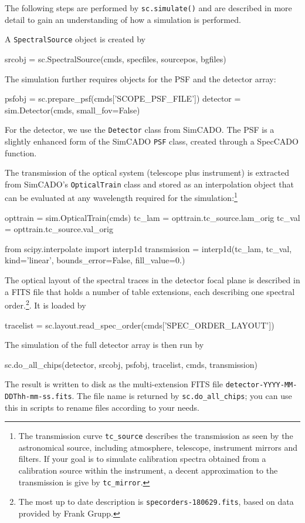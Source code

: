 \documentclass[a4paper,twoside,11pt]{article}
\begin{document}
The following steps are performed by \lstinline{sc.simulate()} and are
described in more detail to gain an understanding of how a simulation
is performed.

A \lstinline{SpectralSource} object is created by
\begin{pyin}
srcobj = sc.SpectralSource(cmds, specfiles, sourcepos, bgfiles)
\end{pyin}

The simulation further requires objects for the PSF and the detector
array:
\begin{pyin}
psfobj = sc.prepare_psf(cmds['SCOPE_PSF_FILE'])
detector = sim.Detector(cmds, small_fov=False)
\end{pyin}
For the detector, we use the \lstinline{Detector} class from
SimCADO. The PSF is a slightly enhanced form of the SimCADO
\lstinline{PSF} class, created through a SpecCADO function.

The transmission of the optical system (telescope plus instrument) is
extracted from SimCADO's \lstinline{OpticalTrain} class and stored as
an interpolation object that can be evaluated at any wavelength
required for the simulation:\footnote{The transmission curve
  \lstinline{tc_source} describes the transmission as seen by the
  astronomical source, including atmosphere, telescope, instrument
  mirrors and filters. If your goal is to simulate calibration spectra
  obtained from a calibration source within the instrument, a decent
  approximation to the transmission is give by \lstinline{tc_mirror}.}
\begin{pyin}
opttrain = sim.OpticalTrain(cmds)
tc_lam = opttrain.tc_source.lam_orig
tc_val = opttrain.tc_source.val_orig

from scipy.interpolate import interp1d
transmission = interp1d(tc_lam, tc_val, kind='linear',
                        bounds_error=False, fill_value=0.)
\end{pyin}

The optical layout of the spectral traces in the detector focal plane
is described in a FITS file that holds a number of table extensions,
each describing one spectral order.\footnote{The most up to date
  description is \lstinline{specorders-180629.fits}, based on data
  provided by Frank Grupp.}. It is loaded by
\begin{pyin}
tracelist = sc.layout.read_spec_order(cmds['SPEC_ORDER_LAYOUT'])
\end{pyin}

The simulation of the full detector array is then run by
\begin{pyin}
sc.do_all_chips(detector, srcobj, psfobj, tracelist, cmds,
                transmission)
\end{pyin}
The result is written to disk as the multi-extension FITS file
\lstinline{detector-YYYY-MM-DDThh-mm-ss.fits}. The file name is
returned by \lstinline{sc.do_all_chips}; you can use this in scripts
to rename files according to your needs.
\end{document}

